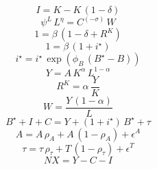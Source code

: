 \noindent[name= `Ley acumu. del capital']
\begin{dmath}
{I}={K}-{K}\, \left(1-{\delta}\right)
\end{dmath}
\noindent[name= `Oferta de trabajo']
\begin{dmath}
{\psi^L}\, {L}^{{\eta}}={C}^{\left(-{\sigma}\right)}\, {W}
\end{dmath}
\noindent[name= `Ecuación de Euler']
\begin{dmath}
1={\beta}\, \left(1-{\delta}+{R^{K}}\right)
\end{dmath}
\noindent[name= `Demanda de bonos']
\begin{dmath}
1={\beta}\, \left(1+{i^{\star}}\right)
\end{dmath}
\noindent[name= `Tasa de interés deuda']
\begin{dmath}
{i^{\star}}={i^{\star}}\, \exp\left({\phi_{B}}\, \left({B^{\star}}-{B}\right)\right)
\end{dmath}
\noindent[name= `Función de producción']
\begin{dmath}
{Y}={A}\, {K}^{{\alpha}}\, {L}^{1-{\alpha}}
\end{dmath}
\noindent[name= `Demanda de capital']
\begin{dmath}
{R^{K}}={\alpha}\, \frac{{Y}}{{K}}
\end{dmath}
\noindent[name= `Demanda de trabajo']
\begin{dmath}
{W}=\frac{{Y}\, \left(1-{\alpha}\right)}{{L}}
\end{dmath}
\noindent[name= `Demanda agregada']
\begin{dmath}
{B^{\star}}+{I}+{C}={Y}+\left(1+{i^{\star}}\right)\, {B^{\star}}+{\tau}
\end{dmath}
\noindent[name= `Productividad']
\begin{dmath}
{A}={A}\, {\rho_{A}}+{A}\, \left(1-{\rho_{A}}\right)+{\epsilon^{A}}
\end{dmath}
\noindent[name= `Transferencias']
\begin{dmath}
{\tau}={\tau}\, {\rho_{\tau}}+{T}\, \left(1-{\rho_{\tau}}\right)+{\epsilon^{T}}
\end{dmath}
\noindent[name= `Exportaciones netas']
\begin{dmath}
{NX}={Y}-{C}-{I}
\end{dmath}
